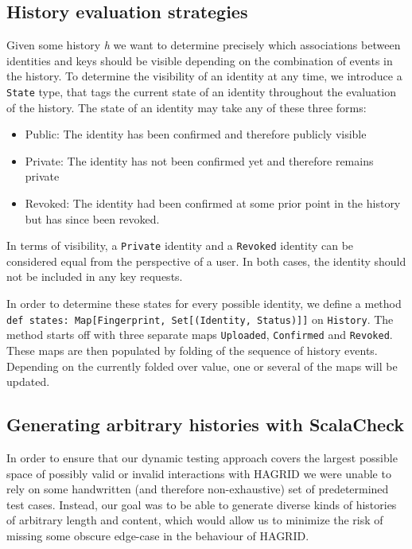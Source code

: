\subsection{History evaluation strategies}
Given some history \emph{h} we want to determine precisely which associations between identities and keys should be visible depending on the combination of events in the history.
To determine the visibility of an identity at any time, we introduce a \texttt{State} type, that tags the current state of an identity throughout the evaluation of the history.
The state of an identity may take any of these three forms: 
\begin{itemize}
    \item Public: The identity has been confirmed and therefore publicly visible
    \item Private: The identity has not been confirmed yet and therefore remains private
    \item Revoked: The identity had been confirmed at some prior point in the history but has since been revoked.
\end{itemize}
In terms of visibility, a \texttt{Private} identity and a \texttt{Revoked} identity can be considered equal from the perspective of a user. In both cases, the identity should not be included in any key requests.

In order to determine these states for every possible identity, we define a method \texttt{def states: Map[Fingerprint, Set[(Identity, Status)]]} on \texttt{History}.
The method starts off with three separate maps \texttt{Uploaded}, \texttt{Confirmed} and \texttt{Revoked}. These maps are then populated by folding of the sequence of history events.
Depending on the currently folded over value, one or several of the maps will be updated. 


\newpage

\subsection{Generating arbitrary histories with ScalaCheck}
In order to ensure that our dynamic testing approach covers the largest possible space of possibly valid or invalid interactions with HAGRID we were unable to rely on some handwritten (and therefore non-exhaustive) set of predetermined test cases. Instead, our goal was to be able to generate diverse kinds of histories of arbitrary length and content, which would allow us to minimize the risk of missing some obscure edge-case in the behaviour of HAGRID.

